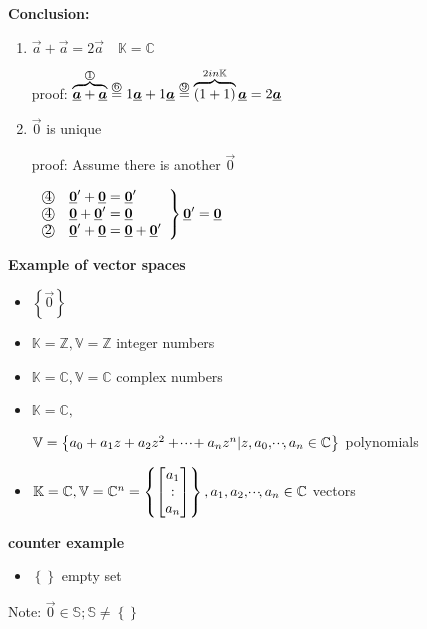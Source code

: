 \textbf{Conclusion:}
\begin{enumerate}
\item $\vec{a}+\vec{a}=2\vec{a} \quad \mathbb{K}=\mathbb{C}$

proof:	$\overbrace{\underline{\boldsymbol {a}}+\underline{\boldsymbol {a}}}^{\textrm{\textcircled{1}}}  \overset{\textrm{\textcircled{6}}}{=} 1\underline{\boldsymbol {a}}+1\underline{\boldsymbol {a}} \overset{\textrm{\textcircled{9}}}{=} \overbrace{(1+1)}^{2 in\mathbb{K}}\underline{\boldsymbol {a}}=2\underline{\boldsymbol {a}}$
\item $\vec{0}$ is unique 


proof: Assume there is another $\vec{0}$

$\left. \begin{array}{l}
\textrm{\textcircled{4}}\quad \underline{\boldsymbol {0}}'+\underline{\boldsymbol {0}}= \underline{\boldsymbol {0}}'\\
\textrm{\textcircled{4}}\quad \underline{\boldsymbol {0}}+\underline{\boldsymbol {0}}'= \underline{\boldsymbol {0}}\\
\textrm{\textcircled{2}}\quad \underline{\boldsymbol {0}}'+\underline{\boldsymbol {0}}=\underline{\boldsymbol {0}}+\underline{\boldsymbol {0}}'
\end{array} \right\rbrace
\underline{\boldsymbol {0}}'=\underline{\boldsymbol {0}}$
\end{enumerate}

\textbf{Example of vector spaces}

\begin{itemize}
\item $\left\lbrace\vec{0}\right\rbrace$ 
\item $\mathbb{K}=\mathbb{Z}, \mathbb{V}=\mathbb{Z}$ \quad integer numbers
\item $\mathbb{K}=\mathbb{C}, \mathbb{V}=\mathbb{C}$ \quad complex numbers
\item $\mathbb{K}=\mathbb{C},$

$\mathbb{V}=\left\lbrace a_0+a_1z+a_2z^2+ \shdots +a_nz^n |z,a_0,\shdots,a_n \in \mathbb{C} \right\rbrace$ \quad polynomials
\item $\mathbb{K}=\mathbb{C}, \mathbb{V}=\mathbb{C}^n=\left\lbrace \begin{bmatrix}
a_1 \\ : \\ a_n
\end{bmatrix} \right\rbrace, a_1,a_2,\!\cdot \!\cdot\!\cdot\!,a_n \in \mathbb{C}$ \quad vectors 
\end{itemize}

\textbf{counter example}

\begin{itemize}
\item $\left\lbrace \right\rbrace$ \quad empty set
\end{itemize}

Note: $\vec{0}\in\mathbb{S}; \mathbb{S}\neq\left\lbrace\right\rbrace$

